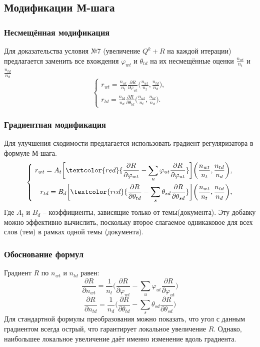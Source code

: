 \documentclass[utf8]{beamer}
\renewcommand{\phi}{\varphi}
\begin{document}
	\subsection{Модификации М-шага}
	
\begin{frame}
\frametitle{Несмещённая модификация}
Для доказательства условия №7 (увеличение $Q^k+R$ на каждой итерации) предлагается заменить все вхождения $\phi_{wt}$ и $\theta_{td}$ на их несмещённые оценки $\frac{n_{wt}}{n_t}$ и $\frac{n_{td}}{n_d}$
\[
\left\{
	\begin{aligned}
		r_{wt} =  \frac{n_{wt}}{n_t} \frac{\partial{R}}{\partial{\phi_{wt}}} \bigg(\frac{n_{wt}}{n_t}, \frac{n_{td}}{n_d}\bigg),\\
		r_{td} = \frac{n_{td}}{n_d} \frac{\partial{R}}{\partial{\theta_{td}}} \bigg(\frac{n_{wt}}{n_t}, \frac{n_{td}}{n_d}\bigg).
	\end{aligned}
\right.
\]
\end{frame}

	
\begin{frame}
\frametitle{Градиентная модификация}
Для улучшения сходимости предлагается использовать градиент регуляризатора в формуле М-шага.
\[
\left\{\
	\begin{aligned}
		r_{wt} =  A_t \bigg[\textcolor{red} {\frac{\partial{R}}{\partial{\phi_{wt}}} - \sum\limits_u \phi_{ut} \frac{\partial{R}}{\partial{\phi_{ut}}} }\bigg] \bigg(\frac{n_{wt}}{n_t}, \frac{n_{td}}{n_d}\bigg),\\
		r_{td} =  B_d \bigg[ \textcolor{red} {\frac{\partial{R}}{\partial{\theta_{td}}} - \sum\limits_s \theta_{sd} \frac{\partial{R}}{\partial{\theta_{sd}}} }\bigg] \bigg(\frac{n_{wt}}{n_t}, \frac{n_{td}}{n_d}\bigg),
	\end{aligned}
\right.
\]
Где $A_t$ и $B_d$ -- коэффициенты, зависящие только от темы(документа). Эту добавку можно эффективно вычислить, поскольку второе слагаемое одникаковое для всех слов (тем) в рамках одной темы (документа).
\end{frame}


\begin{frame}
\frametitle{Обоснование формул}
Градиент $R$ по $n_{wt}$ и $n_{td}$ равен:
\[
\frac{\partial{R}}{\partial{n_{wt}}} = \frac{1}{n_t} \bigg(\frac{\partial{R}}{\partial{\phi_{wt}}} - \sum\limits_u \phi_{ut} \frac{\partial{R}}{\partial{\phi_{ut}}}\bigg)
\]
\[
\frac{\partial{R}}{\partial{n_{td}}} = \frac{1}{n_d} \bigg( \frac{\partial{R}}{\partial{\theta_{td}}} - \sum\limits_s \theta_{sd} \frac{\partial{R}}{\partial{\theta_{sd}}} \bigg)
\]
Для стандартной формулы преобразования можно показать, что угол с данным градиентом всегда острый, что гарантирует локальное увеличение $R$. Однако, наибольшее локальное увеличение даёт именно изменение вдоль градиента.
\end{frame}
\end{document}
